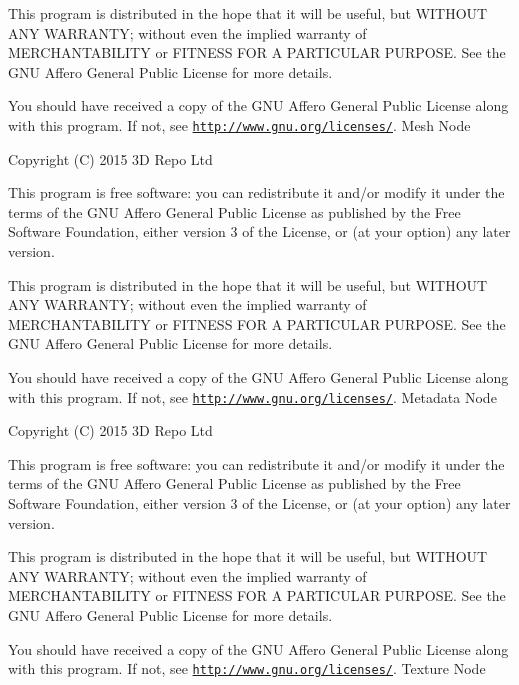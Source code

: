 This program is distributed in the hope that it will be useful, but W\+I\+T\+H\+O\+U\+T A\+N\+Y W\+A\+R\+R\+A\+N\+T\+Y; without even the implied warranty of M\+E\+R\+C\+H\+A\+N\+T\+A\+B\+I\+L\+I\+T\+Y or F\+I\+T\+N\+E\+S\+S F\+O\+R A P\+A\+R\+T\+I\+C\+U\+L\+A\+R P\+U\+R\+P\+O\+S\+E. See the G\+N\+U Affero General Public License for more details.

You should have received a copy of the G\+N\+U Affero General Public License along with this program. If not, see \href{http://www.gnu.org/licenses/}{\tt http\+://www.\+gnu.\+org/licenses/}. Mesh Node

Copyright (C) 2015 3\+D Repo Ltd

This program is free software\+: you can redistribute it and/or modify it under the terms of the G\+N\+U Affero General Public License as published by the Free Software Foundation, either version 3 of the License, or (at your option) any later version.

This program is distributed in the hope that it will be useful, but W\+I\+T\+H\+O\+U\+T A\+N\+Y W\+A\+R\+R\+A\+N\+T\+Y; without even the implied warranty of M\+E\+R\+C\+H\+A\+N\+T\+A\+B\+I\+L\+I\+T\+Y or F\+I\+T\+N\+E\+S\+S F\+O\+R A P\+A\+R\+T\+I\+C\+U\+L\+A\+R P\+U\+R\+P\+O\+S\+E. See the G\+N\+U Affero General Public License for more details.

You should have received a copy of the G\+N\+U Affero General Public License along with this program. If not, see \href{http://www.gnu.org/licenses/}{\tt http\+://www.\+gnu.\+org/licenses/}. Metadata Node

Copyright (C) 2015 3\+D Repo Ltd

This program is free software\+: you can redistribute it and/or modify it under the terms of the G\+N\+U Affero General Public License as published by the Free Software Foundation, either version 3 of the License, or (at your option) any later version.

This program is distributed in the hope that it will be useful, but W\+I\+T\+H\+O\+U\+T A\+N\+Y W\+A\+R\+R\+A\+N\+T\+Y; without even the implied warranty of M\+E\+R\+C\+H\+A\+N\+T\+A\+B\+I\+L\+I\+T\+Y or F\+I\+T\+N\+E\+S\+S F\+O\+R A P\+A\+R\+T\+I\+C\+U\+L\+A\+R P\+U\+R\+P\+O\+S\+E. See the G\+N\+U Affero General Public License for more details.

You should have received a copy of the G\+N\+U Affero General Public License along with this program. If not, see \href{http://www.gnu.org/licenses/}{\tt http\+://www.\+gnu.\+org/licenses/}. Texture Node

